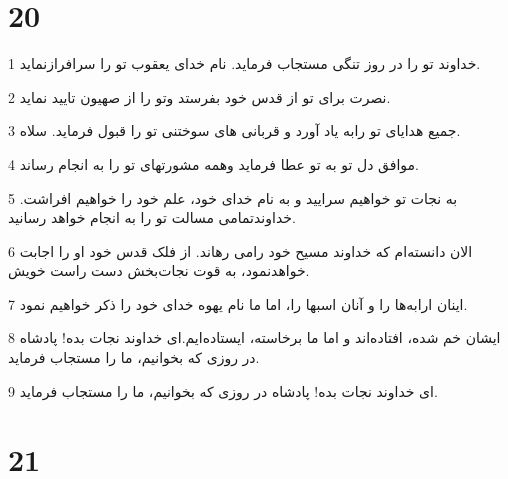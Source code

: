 \chapter{20}

\par 1 خداوند تو را در روز تنگی مستجاب فرماید. نام خدای یعقوب تو را سرافرازنماید.
\par 2 نصرت برای تو از قدس خود بفرستد وتو را از صهیون تایید نماید.
\par 3 جمیع هدایای تو رابه یاد آورد و قربانی های سوختنی تو را قبول فرماید. سلاه.
\par 4 موافق دل تو به تو عطا فرماید وهمه مشورتهای تو را به انجام رساند.
\par 5 به نجات تو خواهیم سرایید و به نام خدای خود، علم خود را خواهیم افراشت. خداوندتمامی مسالت تو را به انجام خواهد رسانید.
\par 6 الان دانسته‌ام که خداوند مسیح خود رامی رهاند. از فلک قدس خود او را اجابت خواهدنمود، به قوت نجات‌بخش دست راست خویش.
\par 7 اینان ارابه‌ها را و آنان اسبها را، اما ما نام یهوه خدای خود را ذکر خواهیم نمود.
\par 8 ایشان خم شده، افتاده‌اند و اما ما برخاسته، ایستاده‌ایم.‌ای خداوند نجات بده! پادشاه در روزی که بخوانیم، ما را مستجاب فرماید.
\par 9 ‌ای خداوند نجات بده! پادشاه در روزی که بخوانیم، ما را مستجاب فرماید.
 
\chapter{21}

